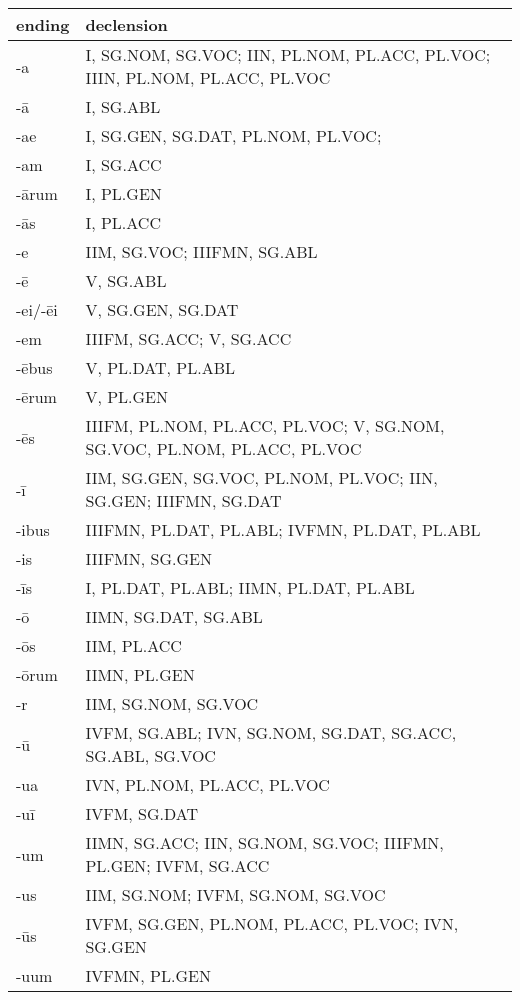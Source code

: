 \begin{tabular}{ll}
    \toprule
    ending & declension \\ \midrule
    -a & I, SG.NOM, SG.VOC; IIN, PL.NOM, PL.ACC, PL.VOC; IIIN, PL.NOM, PL.ACC, PL.VOC \\ 
    -ā & I, SG.ABL \\ 
    -ae & I, SG.GEN, SG.DAT, PL.NOM, PL.VOC;  \\ 
    -am & I, SG.ACC \\ 
    -ārum & I, PL.GEN \\ 
    -ās & I, PL.ACC \\ 
    -e & IIM, SG.VOC; IIIFMN, SG.ABL \\ 
    -ē & V, SG.ABL \\ 
    -ei/-ēi & V, SG.GEN, SG.DAT \\ 
    -em & IIIFM, SG.ACC; V, SG.ACC \\ 
    -ēbus & V, PL.DAT, PL.ABL \\ 
    -ērum & V, PL.GEN \\ 
    -ēs & IIIFM, PL.NOM, PL.ACC, PL.VOC; V, SG.NOM, SG.VOC, PL.NOM, PL.ACC, PL.VOC \\ 
    -ī & IIM, SG.GEN, SG.VOC, PL.NOM, PL.VOC; IIN, SG.GEN; IIIFMN, SG.DAT \\ 
    -ibus & IIIFMN, PL.DAT, PL.ABL; IVFMN, PL.DAT, PL.ABL \\ 
    -is & IIIFMN, SG.GEN \\ 
    -īs & I, PL.DAT, PL.ABL; IIMN, PL.DAT, PL.ABL \\ 
    -ō & IIMN, SG.DAT, SG.ABL \\ 
    -ōs & IIM, PL.ACC \\ 
    -ōrum & IIMN, PL.GEN \\ 
    -r & IIM, SG.NOM, SG.VOC \\ 
    -ū & IVFM, SG.ABL; IVN, SG.NOM, SG.DAT, SG.ACC, SG.ABL, SG.VOC \\ 
    -ua & IVN, PL.NOM, PL.ACC, PL.VOC \\ 
    -uī & IVFM, SG.DAT \\ 
    -um & IIMN, SG.ACC; IIN, SG.NOM, SG.VOC; IIIFMN, PL.GEN; IVFM, SG.ACC \\ 
    -us & IIM, SG.NOM; IVFM, SG.NOM, SG.VOC \\ 
    -ūs & IVFM, SG.GEN, PL.NOM, PL.ACC, PL.VOC; IVN, SG.GEN \\ 
    -uum & IVFMN, PL.GEN \\ \bottomrule
\end{tabular}